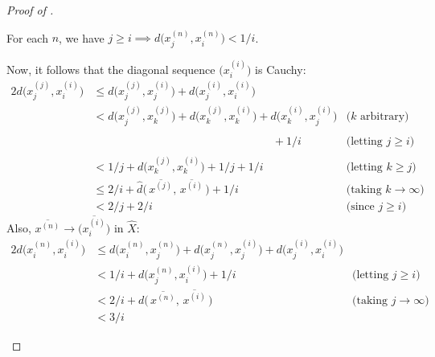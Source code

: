 \begin{proof}[Proof of ]
\begin{subproof}
\begin{mylist}
				\item For each $n$, we have $j\ge i\implies d\bigl(x^{(n)}_j, x^{(n)}_i\bigr) < 1/i$.
			\end{mylist}
			Now, it follows that the diagonal sequence $\bigl(x^{(i)}_i\bigr)$ is Cauchy:
			\begin{alignat*}{2}
				d\bigl(x^{(j)}_j, x^{(i)}_i\bigr)
				& \le d\bigl(x^{(j)}_j, x^{(i)}_j\bigr) + d\bigl(x^{(i)}_j, x^{(i)}_i\bigr)\\
				& < d\bigl(x^{(j)}_j, x^{(j)}_k\bigr) + d\bigl(x^{(j)}_k, x^{(i)}_k\bigr) + d\bigl(x^{(i)}_k, x^{(i)}_j\bigr) & \text{($k$ arbitrary)}\\
				& \phantom{{} < d\bigl(x^{(j)}_j, x^{(j)}_k\bigr) + d\bigl(x^{(j)}_k, x^{(i)}_k\bigr) abc} {}+ 1/i & \text{(letting $j\ge i$)}\\
				& < 1/j + d\bigl(x^{(j)}_k, x^{(i)}_k\bigr) + 1/j +1/i & \text{(letting $k\ge j$)}\\
				& \le 2/i + \hat d\bigl(\, \overline{x^{(j)}},\, \overline{x^{(i)}}\, \bigr) + 1/i & \text{(taking $k\to \infty$)}\\
				& < 2/j + 2/i & \text{(since $j\ge i$)}
 			\end{alignat*}
			Also, $\overline{x^{(n)}}\to \overline{\bigl(x^{(i)}_i\bigr)}$ in $\hat X$:
			\begin{alignat*}{2}
				d\bigl( x^{(n)}_i, x^{(i)}_i \bigr)
				& \le d\bigl( x^{(n)}_i, x^{(n)}_j \bigr) + d\bigl( x^{(n)}_j, x^{(i)}_j \bigr) + d\bigl( x^{(i)}_j, x^{(i)}_i \bigr)\\
				& < 1/i + d\bigl( x^{(n)}_j, x^{(i)}_i \bigr) + 1/i & \text{(letting $j\ge i$)}\\
				& < 2/i + d\bigl(\, \overline{x^{(n)}},\,\overline{x^{(i)}} \,\bigr) & \text{(taking $j\to\infty$)}\\
				& < 3/i
			\end{alignat*}
		\end{subproof}


\end{proof}
